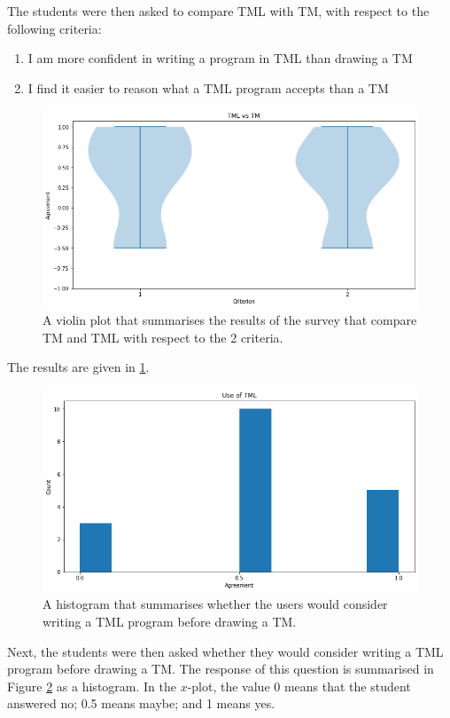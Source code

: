 \begin{appendices}
The students were then asked to compare TML with TM, with respect to the following criteria:
\begin{enumerate}
    \item I am more confident in writing a program in TML than drawing a TM
    \item I find it easier to reason what a TML program accepts than a TM
\end{enumerate}
\begin{figure}[htb]
    \centering
    \includegraphics[scale=0.3]{images/tml-v-tm.png}
    \caption{A violin plot that summarises the results of the survey that compare TM and TML with respect to the 2 criteria.}
    \label{fig:tml-v-tm}
\end{figure}
The results are given in \ref{fig:tml-v-tm}.

\begin{figure}[htb]
    \centering
    \includegraphics[scale=0.3]{images/use-tml.png}
    \caption{A histogram that summarises whether the users would consider writing a TML program before drawing a TM.}
    \label{fig:use-tml}
\end{figure}
Next, the students were then asked whether they would consider writing a TML program before drawing a TM. The response of this question is summarised in Figure \ref{fig:use-tml} as a histogram. In the $x$-plot, the value 0 means that the student answered no; 0.5 means maybe; and 1 means yes.


\end{appendices}
